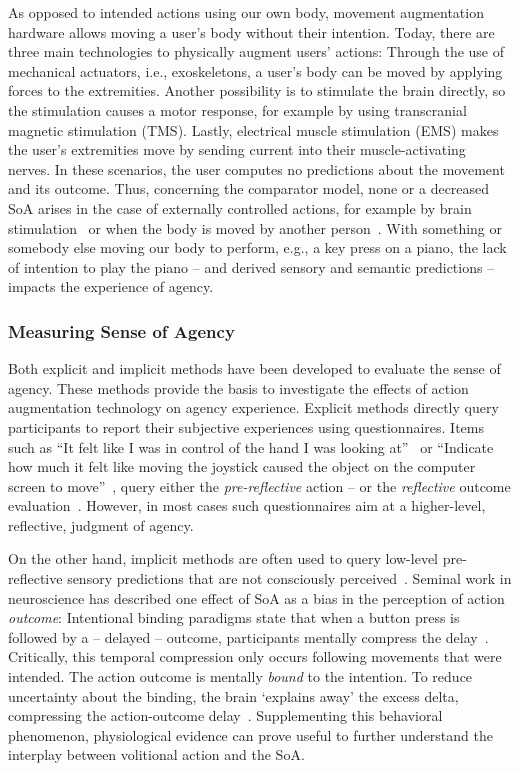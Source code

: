 As opposed to intended actions using our own body, movement augmentation hardware allows moving a user's body without their intention. Today, there are three main technologies to physically augment users' actions: Through the use of mechanical actuators, i.e., exoskeletons, a user's body can be moved by applying forces to the extremities. Another possibility is to stimulate the brain directly, so the stimulation causes a motor response, for example by using transcranial magnetic stimulation (TMS). Lastly, electrical muscle stimulation (EMS) makes the user's extremities move by sending current into their muscle-activating nerves. In these scenarios, the user computes no predictions about the movement and its outcome. Thus, concerning the comparator model, none or a decreased SoA arises in the case of externally controlled actions, for example by brain stimulation~\cite{Haggard2002-sz} or when the body is moved by another person~\cite{Kuhn2013-ls}. With something or somebody else moving our body to perform, e.g., a key press on a piano, the lack of intention to play the piano -- and derived sensory and semantic predictions -- impacts the experience of agency. 

\subsubsection{Measuring Sense of Agency}
Both explicit and implicit methods have been developed to evaluate the sense of agency. These methods provide the basis to investigate the effects of action augmentation technology on agency experience. Explicit methods directly query participants to report their subjective experiences using questionnaires. Items such as ``It felt like I was in control of the hand I was looking at''~\cite{Haggard2002-sz} or ``Indicate how much it felt like moving the joystick caused the object on the computer screen to move''~\cite{Ebert2010-lu}, query either the \textit{pre-reflective} action -- or the \textit{reflective} outcome evaluation~\cite{Moore2012-dk}. However, in most cases such questionnaires aim at a higher-level, reflective, judgment of agency. 

On the other hand, implicit methods are often used to query low-level pre-reflective sensory predictions that are not consciously perceived~\cite{Moore2016-ub, Limerick2014-un, Moore2012-ic}. Seminal work in neuroscience has described one effect of SoA as a bias in the perception of action \textit{outcome}: Intentional binding paradigms state that when a button press is followed by a -- delayed -- outcome, participants mentally compress the delay~\cite{Haggard2002-sz}. Critically, this temporal compression only occurs following movements that were intended. The action outcome is mentally \textit{bound} to the intention. To reduce uncertainty about the binding, the brain `explains away' the excess delta, compressing the action-outcome delay~\cite{Barlas2018-bq}. Supplementing this behavioral phenomenon, physiological evidence can prove useful to further understand the interplay between volitional action and the SoA.

